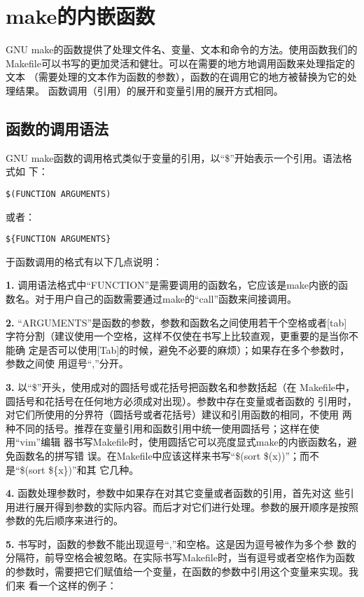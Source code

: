 ﻿\chapter{make的内嵌函数}

GNU make的函数提供了处理文件名、变量、文本和命令的方法。使用函数我们的
Makefile可以书写的更加灵活和健壮。可以在需要的地方地调用函数来处理指定的文本
（需要处理的文本作为函数的参数），函数的在调用它的地方被替换为它的处理结果。
函数调用（引用）的展开和变量引用的展开方式相同。

\section{函数的调用语法}
GNU make函数的调用格式类似于变量的引用，以“\$”开始表示一个引用。语法格式如
下：

\begin{Verbatim}[]
$(FUNCTION ARGUMENTS)
\end{Verbatim}
\noindent 或者：
\begin{Verbatim}[]
${FUNCTION ARGUMENTS}
\end{Verbatim}

于函数调用的格式有以下几点说明：

\textbf{1.} 调用语法格式中“FUNCTION”是需要调用的函数名，它应该是make内嵌的函
数名。对于用户自己的函数需要通过make的“call”函数来间接调用。

\textbf{2.} “ARGUMENTS”是函数的参数，参数和函数名之间使用若干个空格或者[tab]
字符分割（建议使用一个空格，这样不仅使在书写上比较直观，更重要的是当你不能确
定是否可以使用[Tab]的时候，避免不必要的麻烦）；如果存在多个参数时，参数之间使
用逗号“,”分开。

\textbf{3.} 以“\$”开头，使用成对的圆括号或花括号把函数名和参数括起（在
Makefile中，圆括号和花括号在任何地方必须成对出现）。参数中存在变量或者函数的
引用时，对它们所使用的分界符（圆括号或者花括号）建议和引用函数的相同，不使用
两种不同的括号。推荐在变量引用和函数引用中统一使用圆括号；这样在使用“vim”编辑
器书写Makefile时，使用圆括它可以亮度显式make的内嵌函数名，避免函数名的拼写错
误。在Makefile中应该这样来书写“\$(sort \$(x))”；而不是“\$(sort \$\{x\})”和其
它几种。

\textbf{4.} 函数处理参数时，参数中如果存在对其它变量或者函数的引用，首先对这
些引用进行展开得到参数的实际内容。而后才对它们进行处理。参数的展开顺序是按照
参数的先后顺序来进行的。

\textbf{5.} 书写时，函数的参数不能出现逗号“,”和空格。这是因为逗号被作为多个参
数的分隔符，前导空格会被忽略。在实际书写Makefile时，当有逗号或者空格作为函数
的参数时，需要把它们赋值给一个变量，在函数的参数中引用这个变量来实现。我们来
看一个这样的例子：

